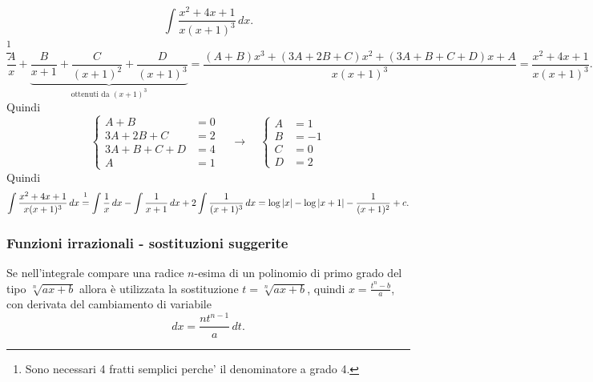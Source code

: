 \begin{example}
    \begin{equation*}
        \int\frac{x^2+4x+1}{x(x+1)^3}\, dx.
    \end{equation*}
    \footnote{Sono necessari 4 fratti semplici perche' il denominatore a grado 4.}
    \begin{equation*}
        \frac{A}{x}+\underbrace{\frac{B}{x+1}+\frac{C}{(x+1)^2}+\frac{D}{(x+1)^3}}_{\text{ottenuti da }(x+1)^3}=\frac{(A+B)x^3+(3A+2B+C)x^2+(3A+B+C+D)x+A}{x(x+1)^3}=\frac{x^2+4x+1}{x(x+1)^3}.
    \end{equation*}
    Quindi
    \begin{equation*}
        \begin{cases}
            A+B &=0\\
            3A+2B+C &=2\\
            3A+B+C+D&=4\\
            A &=1
        \end{cases}\quad\rightarrow\quad
        \begin{cases}
            A &=1\\
            B &=-1\\
            C &= 0\\
            D &= 2
        \end{cases}
    \end{equation*}
    Quindi
    \begin{equation*}
        \int\frac{x^2+4x+1}{x(x+1)^3}\, dx \overset{\footnotemark}{=} \int \frac{1}{x}\, dx - \int \frac{1}{x+1}\, dx + 2\int \frac{1}{(x+1)^3}\, dx=\log|x|-\log|x+1| - \frac{1}{(x+1)^2}+c.
    \end{equation*}
\end{example}

\subsubsection{Funzioni irrazionali - sostituzioni suggerite}
Se nell'integrale compare una radice $n$-esima di un polinomio di primo grado del tipo $\sqrt[n]{ax+b}$ allora è utilizzata la sostituzione $t=\sqrt[n]{ax+b}$, quindi $x=\frac{t^n-b}{a}$, con derivata del cambiamento di variabile
\begin{equation*}
    dx=\frac{nt^{n-1}}{a}\, dt.
\end{equation*}

